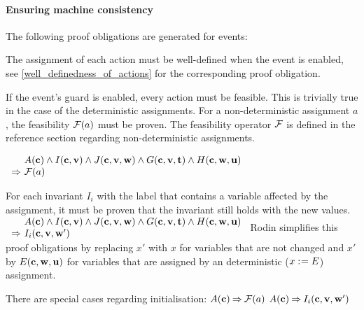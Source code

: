 \paragraph{Ensuring machine consistency}
\label{consistency_proof_obligations}
The following proof obligations are generated for events:

The assignment of each action must be well-defined when the event is enabled, see
  \ref{well_definedness_of_actions} for the corresponding proof obligation.
  
If the event's guard is enabled, every action must be feasible.
  This is trivially true in the case of the deterministic assignments.
  For a non-deterministic assignment $a$, the feasibility $\mathcal{F}(a)$ must be proven.
  The feasibility operator $\mathcal{F}$ is defined in the reference
  section regarding non-deterministic assignments.
  
  {$\begin{array}{r@{\ }l}
      & \axioms \land \absinvariants \land \concinvariants
      \land \absguards \land \concguards \\
      \limp & \actfis(a)      
    \end{array}$}

For each invariant $I_i$ with the label  
  that contains a variable affected by the assignment, it must be proven
  that the invariant still holds with the new values.
  {}%
  {$\begin{array}{r@{\ }l}
      & \axioms \land \absinvariants \land \concinvariants 
      \land \absguards \land \concguards \\
      \limp & I_i(\allconstants,\allvariables')      
    \end{array}$}
  Rodin simplifies this proof obligations by replacing $x'$ with $x$ for variables that are not
  changed and $x'$ by $E(\mathbf{c},\mathbf{w},\mathbf{u})$ 
  for variables that are assigned by an deterministic ($x \mathrel{:\mkern1mu=} E$) assignment.

There are special cases regarding initialisation:
  {$A(\mathbf{c}) \mathbin\Rightarrow  \mathcal{F}(a)$}
  {}%
  {$A(\mathbf{c}) \mathbin\Rightarrow I_i(\mathbf{c},{\mathbf{v},\mathbf{w}}')$}

